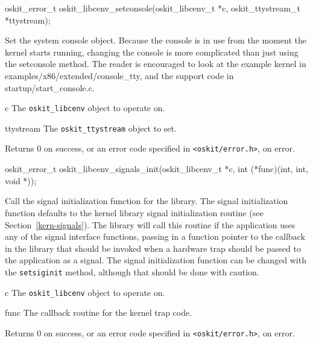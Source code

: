 \begin{apisyn}

	\funcproto oskit_error_t
		   oskit_libcenv_setconsole(oskit_libcenv_t *c,
				oskit_ttystream_t *ttystream);
\end{apisyn}
\begin{apidesc}
	Set the system console object.
	Because the console is in use from the moment the
	kernel starts running, changing the console is more complicated
	than just using the setconsole method. The reader is encouraged to
	look at the example kernel in examples/x86/extended/console_tty,
	and the support code in startup/start_console.c.
\end{apidesc}
\begin{apiparm}
	\item[c]
		The \texttt{oskit_libcenv} object to operate on.
	\item[ttystream]
		The \texttt{oskit_ttystream} object to set.
\end{apiparm}
\begin{apiret}
	Returns 0 on success, or an error code specified in
	{\tt <oskit/error.h>}, on error.
\end{apiret}


\begin{apisyn}

	\funcproto oskit_error_t
		   oskit_libcenv_signals_init(oskit_libcenv_t *c,
				int (*func)(int, int, void *));
\end{apisyn}
\begin{apidesc}
	Call the signal initialization function for the \posix{}
	library. The signal initialization function defaults to the
	\oskit{} kernel library signal initialization routine (see
	Section~\ref{kern-signals}). The \posix{} library will call this
	routine if
	the application uses any of the \posix{} signal interface
	functions, passing in a function pointer to the callback in the
	\posix{} library that should be invoked when a hardware trap should
	be passed to the application as a signal. The signal initialization
	function can be changed with the \texttt{setsiginit} method,
	although that should be done with caution.
\end{apidesc}
\begin{apiparm}
	\item[c]
		The \texttt{oskit_libcenv} object to operate on.
	\item[func]
		The callback routine for the kernel trap code.
\end{apiparm}
\begin{apiret}
	Returns 0 on success, or an error code specified in
	{\tt <oskit/error.h>}, on error.
\end{apiret}


